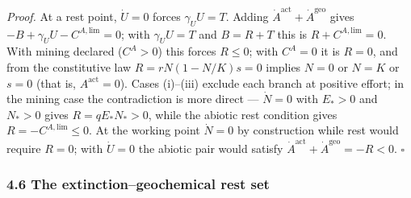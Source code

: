 \documentclass[11pt]{article}
\begin{document}
\emph{Proof.} At a rest point, \(\dot U = 0\) forces \(\gamma_U U = T\).
Adding \(\dot A^{\mathrm{act}} + \dot A^{\mathrm{geo}}\) gives
\(-B + \gamma_U U - C^{A,\mathrm{lim}} = 0\); with \(\gamma_U U = T\)
and \(B = R + T\) this is \(R + C^{A,\mathrm{lim}} = 0\). With mining
declared (\(C^A > 0\)) this forces \(R \le 0\); with \(C^A = 0\) it is
\(R = 0\), and from the constitutive law \(R = rN(1 - N/\allowbreak{}K)s = 0\)
implies \(N = 0\) or \(N = K\) or \(s = 0\) (that is,
\(A^{\mathrm{act}} = 0\)). Cases (i)--(iii) exclude each branch at
positive effort; in the mining case the contradiction is more direct ---
\(\dot N = 0\) with \(E_* > 0\) and \(N_* > 0\) gives
\(R = qE_*N_* > 0\), while the abiotic rest condition gives
\(R = -C^{A,\mathrm{lim}} \le 0\). At the working point \(\dot N = 0\)
by construction while rest would require \(R = 0\); with \(\dot U = 0\)
the abiotic pair would satisfy
\(\dot A^{\mathrm{act}} + \dot A^{\mathrm{geo}} = -R < 0\). \ensuremath{\square}

\subsubsection{4.6 The extinction--geochemical rest
set}\label{the-extinctiongeochemical-rest-set}
\end{document}
